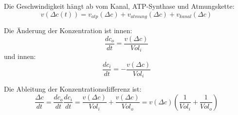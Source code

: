 \documentclass[11pts]{scrartcl}
\begin{document}
	Die \glqq Geschwindigkeit\grqq{} hängt ab vom Kanal, ATP-Synthase und Atmungskette: \[v(\Delta c(t)) = v_{atp}(\Delta c) + v_{atmung}(\Delta c) + v_{kanal}(\Delta c)\]
	
	Die Änderung der Konzentration ist innen: \[ \frac{dc_o}{dt} = \frac{v(\Delta c)}{Vol_i} \]
	und innen: \[ \frac{dc_i}{dt} = - \frac{v(\Delta c)}{Vol_i} \]
	
	Die Ableitung der Konzentrationsdifferenz ist: \[ \frac{\Delta c}{dt} =  \frac{dc_o}{dt} \frac{dc_i}{dt} = \frac{v(\Delta c)}{Vol_i} + \frac{v(\Delta c)}{Vol_o} = v(\Delta c)  \left( \frac{1}{Vol_i} + \frac{1}{Vol_o} \right) \]
	
\end{document}
